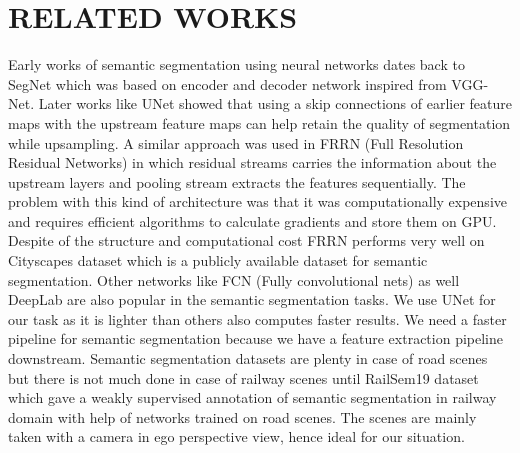 \documentclass[conference]{IEEEtran}
\begin{document}
\section{RELATED WORKS} \label{related_works}
Early works of semantic segmentation using neural networks dates back to SegNet \cite{badrinarayanan2016segnet} which was based on encoder and decoder network inspired from VGG-Net\cite{simonyan2015deep}. Later works like UNet \cite{ronneberger2015unet} showed that using a skip connections of earlier feature maps with the upstream feature maps can help retain the quality of segmentation while upsampling. A similar approach was used in FRRN (Full Resolution Residual Networks) \cite{pohlen2016fullresolution} in which residual streams carries the information about the upstream layers and pooling stream extracts the features sequentially. The problem with this kind of architecture was that it was computationally expensive and requires efficient algorithms to calculate gradients and store them on GPU. Despite of the structure and computational cost FRRN performs very well on Cityscapes \cite{cordts2016cityscapes} dataset which is a publicly available dataset for semantic segmentation. Other networks like FCN (Fully convolutional nets) \cite{long2015fully} as well DeepLab  \cite{chen2017deeplab} are also popular in the semantic segmentation tasks. We use UNet for our task as it is lighter than others also computes faster results. We need a faster pipeline for semantic segmentation because we have a feature extraction pipeline downstream. Semantic segmentation datasets are plenty in case of road scenes but there is not much done in case of railway scenes until RailSem19 dataset \cite{9025646} which gave a weakly supervised annotation of semantic segmentation in railway domain with help of networks trained on road scenes. The scenes are mainly taken with a camera in ego perspective view, hence ideal for our situation. 
\end{document}
